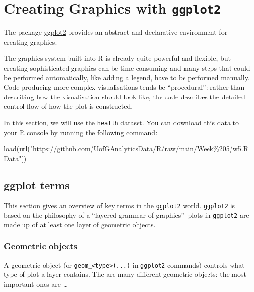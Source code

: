 \documentclass[
]{book}
\newenvironment{Shaded}{\begin{snugshade}}{\end{snugshade}}
\newcommand{\FunctionTok}[1]{\textcolor[rgb]{0.00,0.00,0.00}{#1}}
\newcommand{\NormalTok}[1]{#1}
\newcommand{\StringTok}[1]{\textcolor[rgb]{0.31,0.60,0.02}{#1}}
\begin{document}
\hypertarget{creating-graphics-with-ggplot2}{%
\chapter{\texorpdfstring{Creating Graphics with \texttt{ggplot2}}{Creating Graphics with ggplot2}}\label{creating-graphics-with-ggplot2}}

The package \href{http://ggplot2.tidyverse.org/}{ggplot2} provides an abstract and declarative environment for creating graphics.

The graphics system built into R is already quite powerful and flexible, but creating sophisticated graphics can be time-consuming and many steps that could be performed automatically, like adding a legend, have to be performed manually. Code producing more complex visualisations tends be ``procedural'': rather than describing how the visualisation should look like, the code describes the detailed control flow of how the plot is constructed.

In this section, we will use the \texttt{health} dataset. You can download this data to your R console by running the following command:

\begin{Shaded}
\begin{Highlighting}[]
\FunctionTok{load}\NormalTok{(}\FunctionTok{url}\NormalTok{(}\StringTok{"https://github.com/UofGAnalyticsData/R/raw/main/Week\%205/w5.RData"}\NormalTok{))}
\end{Highlighting}
\end{Shaded}

\hypertarget{ggplot-terms}{%
\section{ggplot terms}\label{ggplot-terms}}

This section gives an overview of key terms in the \texttt{ggplot2} world. \texttt{ggplot2} is based on the philosophy of a ``layered grammar of graphics'': plots in \texttt{ggplot2} are made up of at least one layer of geometric objects.

\hypertarget{geometric-objects}{%
\subsection{Geometric objects}\label{geometric-objects}}

A geometric object (or \texttt{geom\_\textless{}type\textgreater{}(...)} in \texttt{ggplot2} commands) controls what type of plot a layer contains. The are many different geometric objects: the most important ones are \ldots{}
\end{document}
